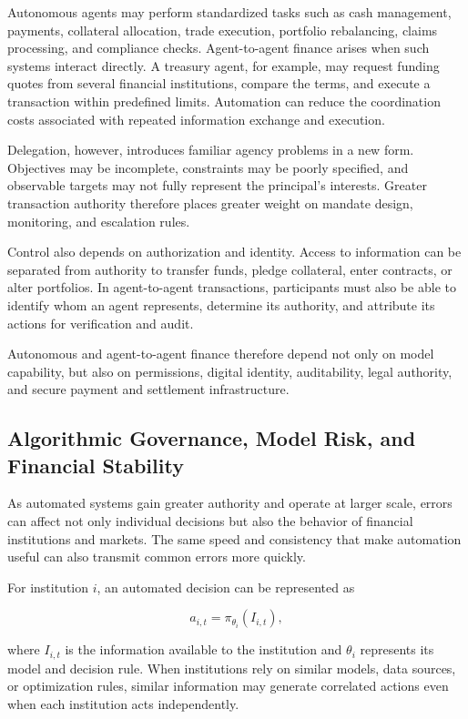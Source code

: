 Autonomous agents may perform standardized tasks such as cash management, payments, collateral allocation, trade execution, portfolio rebalancing, claims processing, and compliance checks. Agent-to-agent finance arises when such systems interact directly. A treasury agent, for example, may request funding quotes from several financial institutions, compare the terms, and execute a transaction within predefined limits. Automation can reduce the coordination costs associated with repeated information exchange and execution.

Delegation, however, introduces familiar agency problems in a new form. Objectives may be incomplete, constraints may be poorly specified, and observable targets may not fully represent the principal's interests. Greater transaction authority therefore places greater weight on mandate design, monitoring, and escalation rules.

Control also depends on authorization and identity. Access to information can be separated from authority to transfer funds, pledge collateral, enter contracts, or alter portfolios. In agent-to-agent transactions, participants must also be able to identify whom an agent represents, determine its authority, and attribute its actions for verification and audit.

Autonomous and agent-to-agent finance therefore depend not only on model capability, but also on permissions, digital identity, auditability, legal authority, and secure payment and settlement infrastructure.


\subsection{Algorithmic Governance, Model Risk, and Financial Stability}

As automated systems gain greater authority and operate at larger scale, errors can affect not only individual decisions but also the behavior of financial institutions and markets. The same speed and consistency that make automation useful can also transmit common errors more quickly.

For institution \(i\), an automated decision can be represented as

\begin{equation}
a_{i,t}=\pi_{\theta_i}(I_{i,t}),
\label{eq:ch24-common-model-action}
\end{equation}

where \(I_{i,t}\) is the information available to the institution and \(\theta_i\) represents its model and decision rule. When institutions rely on similar models, data sources, or optimization rules, similar information may generate correlated actions even when each institution acts independently.

